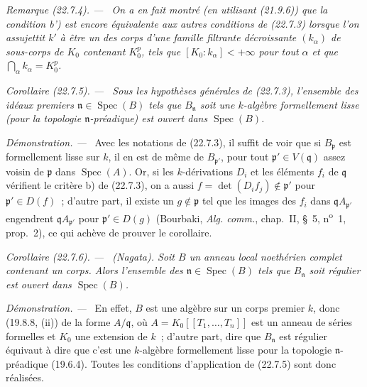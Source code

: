 \documentclass[10pt,oneside]{book}
\makeatletter
\newcommand{\setmanualcurrentlabel}[1]{\def\@currentlabel{#1}}
\newcommand{\oldpage}[2][]{%
  \setcounter{footnote}{0}%
  \marginpar{\scriptsize\textbf{#1}~|~#2}\ignorespaces}
\newenvironment{corollary}[1][]{%
  \setmanualcurrentlabel{#1}\par\medskip\noindent\itshape Corollaire (#1). ---\ }{\par}
\newenvironment{remark}[1][]{%
  \setmanualcurrentlabel{#1}\par\medskip\noindent\itshape Remarque (#1). ---\ }{\par}
\newenvironment{proof}{%
  \par\medskip\noindent\textit{Démonstration. ---\ }}{\par}
\makeatother
\begin{document}
\oldpage[0\textsubscript{IV-1}]{213}

\begin{remark}[22.7.4]
\label{0.22.7.4-fr}
On a en fait montré (en utilisant (21.9.6)) que la condition b') est encore
équivalente aux autres conditions de (22.7.3) lorsque l'on assujettit $k'$ à
être un des corps d'une famille filtrante décroissante $(k_\alpha)$ de
sous-corps de $K_0$ contenant $K_0^p$, tels que
$[K_0:k_\alpha]<+\infty$ pour tout $\alpha$ et que
$\bigcap_\alpha k_\alpha=K_0^p$.
\end{remark}

\begin{corollary}[22.7.5]
\label{0.22.7.5-fr}
Sous les hypothèses générales de (22.7.3), l'ensemble des idéaux premiers
$\mathfrak n\in\operatorname{Spec}(B)$ tels que $B_{\mathfrak n}$ soit une
$k$-algèbre formellement lisse (pour la topologie $\mathfrak n$-préadique)
est ouvert dans $\operatorname{Spec}(B)$.
\end{corollary}

\begin{proof}
Avec les notations de (22.7.3), il suffit de voir que si $B_{\mathfrak p}$
est formellement lisse sur $k$, il en est de même de $B_{\mathfrak p'}$, pour
tout $\mathfrak p'\in V(\mathfrak q)$ assez voisin de $\mathfrak p$ dans
$\operatorname{Spec}(A)$. Or, si les $k$-dérivations $D_i$ et les éléments
$f_i$ de $\mathfrak q$ vérifient le critère b) de (22.7.3), on a aussi
$f=\det(D_if_j)\notin\mathfrak p'$ pour $\mathfrak p'\in D(f)$~; d'autre
part, il existe un $g\notin\mathfrak p$ tel que les images des $f_i$ dans
$\mathfrak qA_{\mathfrak p'}$ engendrent $\mathfrak qA_{\mathfrak p'}$ pour
$\mathfrak p'\in D(g)$ (Bourbaki, \emph{Alg. comm.}, chap.~II, §~5,
n\textsuperscript{o}~1, prop.~2), ce qui achève de prouver le corollaire.
\end{proof}

\begin{corollary}[22.7.6]
\label{0.22.7.6-fr}
\textnormal{(Nagata).} Soit $B$ un anneau local noethérien complet contenant
un corps. Alors l'ensemble des $\mathfrak n\in\operatorname{Spec}(B)$ tels
que $B_{\mathfrak n}$ soit régulier est ouvert dans $\operatorname{Spec}(B)$.
\end{corollary}

\begin{proof}
En effet, $B$ est une algèbre sur un corps premier $k$, donc (19.8.8, (ii))
de la forme $A/\mathfrak q$, où
$A=K_0[[T_1,\ldots,T_n]]$ est un anneau de séries formelles et $K_0$ une
extension de $k$~; d'autre part, dire que $B_{\mathfrak n}$ est régulier
équivaut à dire que c'est une $k$-algèbre formellement lisse pour la topologie
$\mathfrak n$-préadique (19.6.4). Toutes les conditions d'application de
(22.7.5) sont donc réalisées.
\end{proof}
\end{document}
